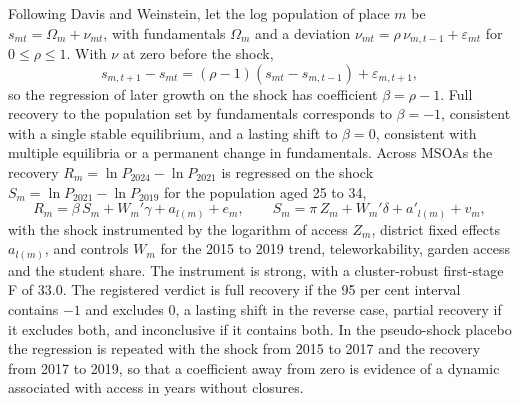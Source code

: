 \documentclass[11pt,a4paper]{article}
\begin{document}
Following Davis and Weinstein, let the log population of place $m$ be $s_{mt} = \Omega_m + \nu_{mt}$, with fundamentals $\Omega_m$ and a deviation $\nu_{mt} = \rho\, \nu_{m,t-1} + \varepsilon_{mt}$ for $0 \le \rho \le 1$. With $\nu$ at zero before the shock,
\begin{equation}\label{eq:dw}
s_{m,t+1} - s_{mt} = (\rho - 1)(s_{mt} - s_{m,t-1}) + \varepsilon_{m,t+1},
\end{equation}
so the regression of later growth on the shock has coefficient $\beta = \rho - 1$. Full recovery to the population set by fundamentals corresponds to $\beta = -1$, consistent with a single stable equilibrium, and a lasting shift to $\beta = 0$, consistent with multiple equilibria or a permanent change in fundamentals. Across MSOAs the recovery $R_m = \ln P_{2024} - \ln P_{2021}$ is regressed on the shock $S_m = \ln P_{2021} - \ln P_{2019}$ for the population aged 25 to 34,
\begin{equation}\label{eq:rec}
R_m = \beta\, S_m + W_m' \gamma + a_{l(m)} + e_m, \qquad S_m = \pi\, Z_m + W_m' \delta + a'_{l(m)} + v_m,
\end{equation}
with the shock instrumented by the logarithm of access $Z_m$, district fixed effects $a_{l(m)}$, and controls $W_m$ for the 2015 to 2019 trend, teleworkability, garden access and the student share. The instrument is strong, with a cluster-robust first-stage F of 33.0. The registered verdict is full recovery if the 95 per cent interval contains $-1$ and excludes 0, a lasting shift in the reverse case, partial recovery if it excludes both, and inconclusive if it contains both. In the pseudo-shock placebo the regression is repeated with the shock from 2015 to 2017 and the recovery from 2017 to 2019, so that a coefficient away from zero is evidence of a dynamic associated with access in years without closures.
\end{document}
